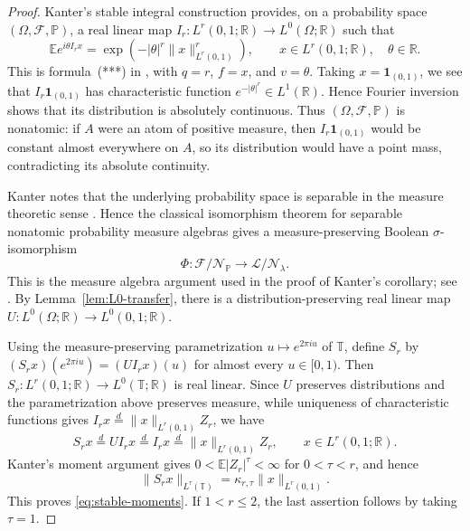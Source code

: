 \documentclass[11pt, reqno]{amsart}
\theoremstyle{definition}
\theoremstyle{remark}
\newcommand{\T}{\mathbb{T}}
\newcommand{\R}{\mathbb{R}}
\begin{document}
\begin{proof}
Kanter's stable integral construction
\cite[Sections~4--5, pp.~405--406]{Kanter1973}
provides, on a probability space
\((\Omega,\mathcal F,\mathbb P)\), a real linear map
\(I_r:L^r(0,1;\R)\to L^0(\Omega;\R)\) such that
\[
        \mathbb E e^{i\theta I_rx}
        =
        \exp\left(
        -|\theta|^r\|x\|_{L^r(0,1)}^r
        \right),
        \qquad
        x\in L^r(0,1;\R),\quad \theta\in\R.
\]
This is formula~\textup{(***)} in
\cite[p.~406]{Kanter1973}, with \(q=r\), \(f=x\), and \(v=\theta\).
Taking \(x=\mathbf1_{(0,1)}\), we see that
\(I_r\mathbf1_{(0,1)}\) has characteristic function
\(e^{-|\theta|^r}\in L^1(\R)\). Hence Fourier inversion shows that
its distribution is absolutely continuous. Thus
\((\Omega,\mathcal F,\mathbb P)\) is nonatomic: if \(A\) were an
atom of positive measure, then \(I_r\mathbf1_{(0,1)}\) would be
constant almost everywhere on \(A\), so its distribution would have
a point mass, contradicting its absolute continuity.

Kanter notes that the underlying probability space is separable in
the measure theoretic sense \cite[p.~405]{Kanter1973}. Hence the
classical isomorphism theorem for separable nonatomic probability
measure algebras
\cite[Section~41, Theorem~C, p.~173]{Halmos1974} gives a
measure-preserving Boolean \(\sigma\)-isomorphism
\[
        \Phi:
        \mathcal F/\mathcal N_{\mathbb P}
        \longrightarrow
        \mathcal L/\mathcal N_\lambda.
\]
This is the measure algebra argument used in the proof of Kanter's
corollary; see \cite[p.~407]{Kanter1973}. By
Lemma~\ref{lem:L0-transfer}, there is a distribution-preserving real
linear map \(U:L^0(\Omega;\R)\to L^0(0,1;\R)\).

Using the measure-preserving parametrization
\(u\mapsto e^{2\pi iu}\) of \(\T\), define \(S_r\) by
\((S_rx)(e^{2\pi iu})=(UI_rx)(u)\) for almost every
\(u\in[0,1)\). Then
\(S_r:L^r(0,1;\R)\to L^0(\T;\R)\) is real linear.
Since \(U\) preserves distributions and the parametrization above
preserves measure, while uniqueness of characteristic functions gives
\(I_rx\overset{d}{=}\|x\|_{L^r(0,1)}Z_r\), we have
\[
        S_rx
        \overset{d}{=}
        UI_rx
        \overset{d}{=}
        I_rx
        \overset{d}{=}
        \|x\|_{L^r(0,1)}Z_r,
        \qquad
        x\in L^r(0,1;\R).
\]Kanter's moment argument
\cite[pp.~406--407]{Kanter1973} gives
\(0<\mathbb E|Z_r|^\tau<\infty\) for \(0<\tau<r\), and hence
\[
        \|S_rx\|_{L^\tau(\T)}
        =
        \kappa_{r,\tau}\|x\|_{L^r(0,1)}.
\]
This proves \eqref{eq:stable-moments}. If \(1<r\le2\), the last
assertion follows by taking \(\tau=1\).
\end{proof}
\end{document}
